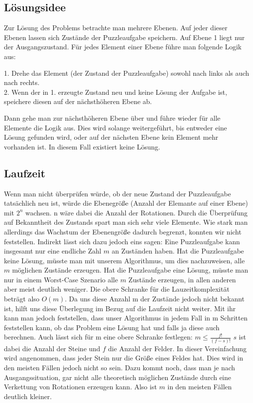 \subsection {Lösungsidee}
	Zur Lösung des Problems betrachte man mehrere Ebenen. Auf jeder dieser Ebenen lassen sich Zustände der Puzzleaufgabe speichern. 
	Auf Ebene 1 liegt nur der Ausgangszustand. Für jedes Element einer Ebene führe man folgende Logik aus:

	1. Drehe das Element (der Zustand der Puzzleaufgabe) sowohl nach links als auch nach rechts.\\
	2. Wenn der in 1. erzeugte Zustand neu und keine Lösung der Aufgabe ist, speichere diesen auf der nächsthöheren Ebene ab.

	Dann gehe man zur nächsthöheren Ebene über und führe wieder für alle Elemente die Logik aus.
	Dies wird solange weitergeführt, bis entweder eine Lösung gefunden wird, oder auf der nächsten Ebene kein Element mehr vorhanden ist.
	In diesem Fall existiert keine Lösung.

	
\subsection{Laufzeit}
	Wenn man nicht überprüfen würde, ob der neue Zustand der Puzzleaufgabe tatsächlich neu ist, würde die Ebenegröße (Anzahl der Elemante auf einer Ebene) mit \(2^n\) wachsen.  
	n wäre dabei die Anzahl der Rotationen. Durch die Überprüfung auf Bekanntheit des Zustands spart man sich sehr viele Elemente. 
	Wie stark man allerdings das Wachstum der Ebenengröße dadurch begrenzt, konnten wir nicht feststellen. Indirekt lässt sich dazu jedoch eins sagen: 
	Eine Puzzleaufgabe kann insgesamt nur eine endliche Zahl \(m\) an Zuständen haben. 
	Hat die Puzzleaufgabe keine Lösung, müsste man mit unserem Algorithmus, um dies nachzuweisen, alle \(m\) möglichen Zustände erzeugen.
	Hat die Puzzleaufgabe eine Lösung, müsste man nur in einem Worst-Case Szenario alle \(m\) Zustände erzeugen, in allen anderen aber meist deutlich weniger.
	Die obere Schranke für die Lauzeitkomplexität beträgt also \(O(m)\). Da uns diese Anzahl m der Zustände jedoch nicht bekannt ist, 
	hilft uns diese Überlegung im Bezug auf die Laufzeit nicht weiter. 
	Mit ihr kann man jedoch feststellen, dass unser Algorithmus in jedem Fall in m Schritten feststellen kann, ob das Problem eine Lösung hat und falls ja diese auch berechnen. 
	Auch lässt sich für m eine obere Schranke festlegen: \(m \le \frac{f!}{(f-s)!}\) \(s\) ist dabei die Anzahl der Steine und \(f\) die Anzahl der Felder. 
	In dieser Vereinfachung wird angenommen, dass jeder Stein nur die Größe eines Feldes hat. Dies wird in den meisten Fällen jedoch nicht so sein.
	Dazu kommt noch, dass man je nach Ausgangssituation, 
	gar nicht alle theoretisch möglichen Zustände durch eine Verkettung von Rotationen erzeugen kann. 
	Also ist \(m\) in den meisten Fällen deutlich kleiner. 

